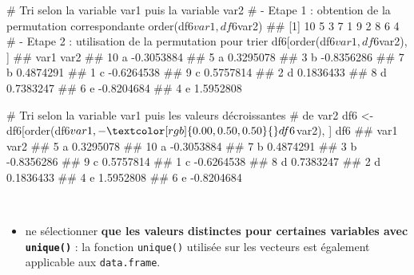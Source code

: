 \documentclass[12pt,twosided, notitlepage]{book}
\newenvironment{Shaded}{}{}
\newcommand{\KeywordTok}[1]{\textcolor[rgb]{0.00,0.00,1.00}{#1}}
\newcommand{\StringTok}[1]{\textcolor[rgb]{0.00,0.50,0.50}{#1}}
\newcommand{\CommentTok}[1]{\textcolor[rgb]{0.00,0.50,0.00}{#1}}
\newcommand{\OperatorTok}[1]{#1}
\newcommand{\NormalTok}[1]{#1}
\providecommand{\tightlist}{%
  \setlength{\itemsep}{0pt}\setlength{\parskip}{0pt}}
\renewenvironment{Shaded}{\begin{snugshade}}{\end{snugshade}}
\begin{document}
\begin{Shaded}
\begin{Highlighting}[]
\CommentTok{# Tri selon la variable var1 puis la variable var2}
\CommentTok{# - Etape 1 : obtention de la permutation correspondante}
\KeywordTok{order}\NormalTok{(df6}\OperatorTok{$}\NormalTok{var1, df6}\OperatorTok{$}\NormalTok{var2)}
\NormalTok{  ##  [1] 10  5  3  7  1  9  2  8  6  4}
\CommentTok{# - Etape 2 : utilisation de la permutation pour trier}
\NormalTok{df6[}\KeywordTok{order}\NormalTok{(df6}\OperatorTok{$}\NormalTok{var1, df6}\OperatorTok{$}\NormalTok{var2), ]}
\NormalTok{  ##    var1       var2}
\NormalTok{  ## 10    a -0.3053884}
\NormalTok{  ## 5     a  0.3295078}
\NormalTok{  ## 3     b -0.8356286}
\NormalTok{  ## 7     b  0.4874291}
\NormalTok{  ## 1     c -0.6264538}
\NormalTok{  ## 9     c  0.5757814}
\NormalTok{  ## 2     d  0.1836433}
\NormalTok{  ## 8     d  0.7383247}
\NormalTok{  ## 6     e -0.8204684}
\NormalTok{  ## 4     e  1.5952808}

\CommentTok{# Tri selon la variable var1 puis les valeurs décroissantes}
\CommentTok{# de var2}
\NormalTok{df6 <-}\StringTok{ }\NormalTok{df6[}\KeywordTok{order}\NormalTok{(df6}\OperatorTok{$}\NormalTok{var1, }\OperatorTok{-}\StringTok{ }\NormalTok{df6}\OperatorTok{$}\NormalTok{var2), ]}
\NormalTok{df6}
\NormalTok{  ##    var1       var2}
\NormalTok{  ## 5     a  0.3295078}
\NormalTok{  ## 10    a -0.3053884}
\NormalTok{  ## 7     b  0.4874291}
\NormalTok{  ## 3     b -0.8356286}
\NormalTok{  ## 9     c  0.5757814}
\NormalTok{  ## 1     c -0.6264538}
\NormalTok{  ## 8     d  0.7383247}
\NormalTok{  ## 2     d  0.1836433}
\NormalTok{  ## 4     e  1.5952808}
\NormalTok{  ## 6     e -0.8204684}
\end{Highlighting}
\end{Shaded}

~

\begin{itemize}
\tightlist
\item
  ne sélectionner \textbf{que les valeurs distinctes pour certaines
  variables avec \texttt{unique()}} : la
  fonction \texttt{unique()} utilisée sur les vecteurs est également
  applicable aux \texttt{data.frame}.
\end{itemize}
\end{document}
